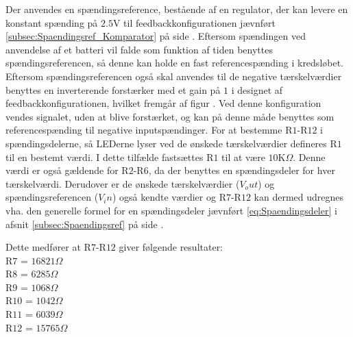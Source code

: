 Der anvendes en spændingsreference, bestående af en regulator, der kan levere en konstant spænding på $2.5$V til feedbackkonfigurationen jævnført \ref{subsec:Spaendingsref_Komparator} på side \pageref{subsec:Spaendingsref_Komparator}. Eftersom spændingen ved anvendelse af et batteri vil falde som funktion af tiden benyttes spændingsreferencen, så denne kan holde en fast referencespænding i kredsløbet. Eftersom spændingsreferencen også skal anvendes til de negative tærskelværdier benyttes en inverterende forstærker med et gain på $1$ i designet af feedbackkonfigurationen, hvilket fremgår af figur . Ved denne konfiguration vendes signalet, uden at blive forstærket, og kan på denne måde benyttes som referencespænding til negative inputspændinger. For at bestemme R$1$-R$12$ i spændingsdelerne, så LEDerne lyser ved de ønskede tærskelværdier defineres R$1$ til en bestemt værdi. I dette tilfælde fastsættes R$1$ til at være $10$K$\Omega$. Denne værdi er også gældende for R$2$-R$6$, da der benyttes en spændingsdeler for hver tærskelværdi. Derudover er de ønskede tærskelværdier ($V_out$) og spændingsreferencen ($V_in$) også kendte værdier og R$7$-R$12$ kan dermed udregnes vha. den generelle formel for en spændingsdeler jævnført \eqref{eq:Spaendingsdeler} i afsnit \ref{subsec:Spaendingsref} på side \pageref{subsec:Spaendingsref}. 

Dette medfører at R$7$-R$12$ giver følgende resultater:\\
R$7$ = $16821\Omega$ \\
R$8$ = $6285\Omega$ \\
R$9$ = $1068\Omega$ \\
R$10$ = $1042\Omega$ \\
R$11$ = $6039\Omega$ \\
R$12$ = $15765\Omega$ \\


